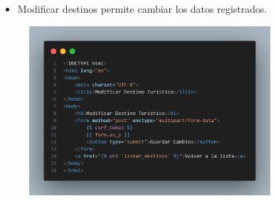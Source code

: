 \documentclass{article}
\begin{document}
	\begin{itemize}
		\item Modificar destinos permite cambiar los datos registrados.
	\end{itemize}
	\begin{figure}[H]
		\centering
		\includegraphics[width=0.8\textwidth,keepaspectratio]{img/modiicar.png}
	\end{figure}
\end{document}
